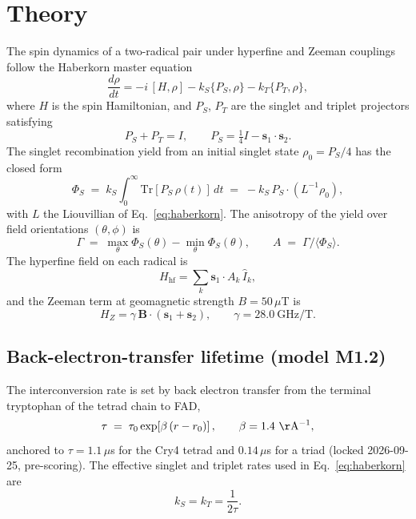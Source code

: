 \documentclass[12pt,a4paper]{article}
\begin{document}
\section{Theory}
The spin dynamics of a two-radical pair under hyperfine and Zeeman couplings follow the Haberkorn master equation
\begin{equation}
\frac{d\rho}{dt} = -i\,[H,\rho] - k_S\{P_S,\rho\} - k_T\{P_T,\rho\}, \label{eq:haberkorn}
\end{equation}
where $H$ is the spin Hamiltonian, and $P_S$, $P_T$ are the singlet and triplet projectors satisfying
\begin{equation}
P_S + P_T = I, \qquad P_S = \tfrac{1}{4}I - \mathbf{s}_1\!\cdot\!\mathbf{s}_2. \label{eq:projectors}
\end{equation}
The singlet recombination yield from an initial singlet state $\rho_0 = P_S/4$ has the closed form
\begin{equation}
\Phi_S \;=\; k_S \int_0^\infty \mathrm{Tr}[P_S\,\rho(t)]\,dt \;=\; -k_S\, P_S \cdot (L^{-1}\rho_0), \label{eq:yield}
\end{equation}
with $L$ the Liouvillian of Eq.~\eqref{eq:haberkorn}. The anisotropy of the yield over field orientations $(\theta,\phi)$ is
\begin{equation}
\Gamma \;=\; \max_{\theta}\Phi_S(\theta) - \min_{\theta}\Phi_S(\theta), \qquad
A \;=\; \Gamma / \langle\Phi_S\rangle. \label{eq:anisotropy}
\end{equation}
The hyperfine field on each radical is
\begin{equation}
H_{\mathrm{hf}} = \sum_k \mathbf{s}_1\!\cdot\!A_k\,\hat I_k, \label{eq:hyperfine}
\end{equation}
and the Zeeman term at geomagnetic strength $B=50\,\mu$T is
\begin{equation}
H_Z = \gamma\, \mathbf{B}\cdot(\mathbf{s}_1+\mathbf{s}_2), \qquad \gamma = 28.0\ \mathrm{GHz/T}. \label{eq:zeeman}
\end{equation}

\subsection{Back-electron-transfer lifetime (model M1.2)}
The interconversion rate is set by back electron transfer from the terminal tryptophan of the tetrad chain to FAD,
\begin{equation}
\tau \;=\; \tau_0 \exp\!\left[\beta\,(r - r_0)\right], \qquad \beta = 1.4\ \mathrm{\AA^{-1}}, \label{eq:backet}
\end{equation}
anchored to $\tau = 1.1\,\mu$s for the Cry4 tetrad and $0.14\,\mu$s for a triad (locked 2026-09-25, pre-scoring). The effective singlet and triplet rates used in Eq.~\eqref{eq:haberkorn} are
\begin{equation}
k_S = k_T = \frac{1}{2\tau}. \label{eq:rates}
\end{equation}
\end{document}
